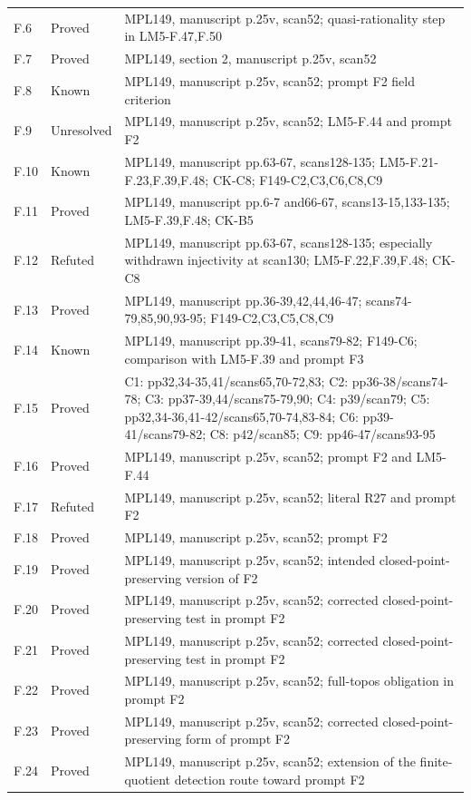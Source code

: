 {\begin{longtable}{p{1.9cm}p{1.7cm}p{10.3cm}}
F.6 & Proved & MPL149, manuscript p.25v, scan52; quasi-rationality step in LM5-F.47,F.50 \\
F.7 & Proved & MPL149, section 2, manuscript p.25v, scan52 \\
F.8 & Known & MPL149, manuscript p.25v, scan52; prompt F2 field criterion \\
F.9 & Unresolved & MPL149, manuscript p.25v, scan52; LM5-F.44 and prompt F2 \\
F.10 & Known & MPL149, manuscript pp.63-67, scans128-135; LM5-F.21-F.23,F.39,F.48; CK-C8; F149-C2,C3,C6,C8,C9 \\
F.11 & Proved & MPL149, manuscript pp.6-7 and66-67, scans13-15,133-135; LM5-F.39,F.48; CK-B5 \\
F.12 & Refuted & MPL149, manuscript pp.63-67, scans128-135; especially withdrawn injectivity at scan130; LM5-F.22,F.39,F.48; CK-C8 \\
F.13 & Proved & MPL149, manuscript pp.36-39,42,44,46-47; scans74-79,85,90,93-95; F149-C2,C3,C5,C8,C9 \\
F.14 & Known & MPL149, manuscript pp.39-41, scans79-82; F149-C6; comparison with LM5-F.39 and prompt F3 \\
F.15 & Proved & C1: pp32,34-35,41/scans65,70-72,83; C2: pp36-38/scans74-78; C3: pp37-39,44/scans75-79,90; C4: p39/scan79; C5: pp32,34-36,41-42/scans65,70-74,83-84; C6: pp39-41/scans79-82; C8: p42/scan85; C9: pp46-47/scans93-95 \\
F.16 & Proved & MPL149, manuscript p.25v, scan52; prompt F2 and LM5-F.44 \\
F.17 & Refuted & MPL149, manuscript p.25v, scan52; literal R27 and prompt F2 \\
F.18 & Proved & MPL149, manuscript p.25v, scan52; prompt F2 \\
F.19 & Proved & MPL149, manuscript p.25v, scan52; intended closed-point-preserving version of F2 \\
F.20 & Proved & MPL149, manuscript p.25v, scan52; corrected closed-point-preserving test in prompt F2 \\
F.21 & Proved & MPL149, manuscript p.25v, scan52; corrected closed-point-preserving test in prompt F2 \\
F.22 & Proved & MPL149, manuscript p.25v, scan52; full-topos obligation in prompt F2 \\
F.23 & Proved & MPL149, manuscript p.25v, scan52; corrected closed-point-preserving form of prompt F2 \\
F.24 & Proved & MPL149, manuscript p.25v, scan52; extension of the finite-quotient detection route toward prompt F2 \\

\end{longtable}}
